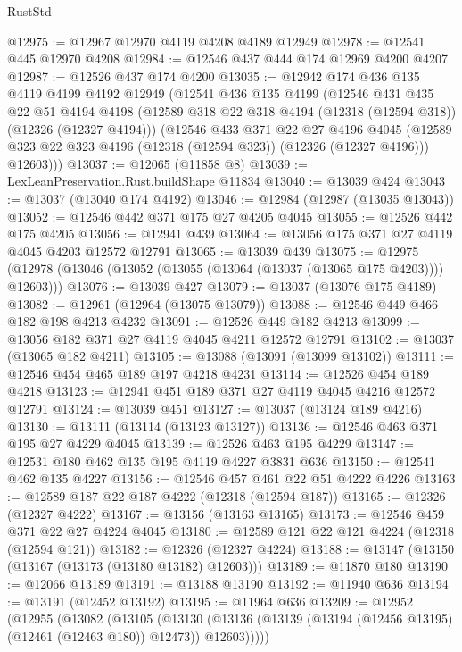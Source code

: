 \begin{lexlean}{RustStd}
\begin{coremodule}
@12975 := @12967 @12970 @4119 @4208 @4189 @12949
@12978 := @12541 @445 @12970 @4208
@12984 := @12546 @437 @444 @174 @12969 @4200 @4207
@12987 := @12526 @437 @174 @4200
@13035 := @12942
    @174
    @436
    @135
    @4119
    @4199
    @4192
    @12949
    (@12541
      @436
      @135
      @4199
      (@12546
        @431
        @435
        @22
        @51
        @4194
        @4198
        (@12589 @318 @22 @318 @4194 (@12318 (@12594 @318)) (@12326 (@12327 @4194)))
        (@12546
          @433
          @371
          @22
          @27
          @4196
          @4045
          (@12589 @323 @22 @323 @4196 (@12318 (@12594 @323)) (@12326 (@12327 @4196)))
          @12603)))
@13037 := @12065 (@11858 @8)
@13039 := LexLeanPreservation.Rust.buildShape @11834
@13040 := @13039 @424
@13043 := @13037 (@13040 @174 @4192)
@13046 := @12984 (@12987 (@13035 @13043))
@13052 := @12546 @442 @371 @175 @27 @4205 @4045
@13055 := @12526 @442 @175 @4205
@13056 := @12941 @439
@13064 := @13056 @175 @371 @27 @4119 @4045 @4203 @12572 @12791
@13065 := @13039 @439
@13075 := @12975 (@12978 (@13046 (@13052 (@13055 (@13064 (@13037 (@13065 @175 @4203)))) @12603)))
@13076 := @13039 @427
@13079 := @13037 (@13076 @175 @4189)
@13082 := @12961 (@12964 (@13075 @13079))
@13088 := @12546 @449 @466 @182 @198 @4213 @4232
@13091 := @12526 @449 @182 @4213
@13099 := @13056 @182 @371 @27 @4119 @4045 @4211 @12572 @12791
@13102 := @13037 (@13065 @182 @4211)
@13105 := @13088 (@13091 (@13099 @13102))
@13111 := @12546 @454 @465 @189 @197 @4218 @4231
@13114 := @12526 @454 @189 @4218
@13123 := @12941 @451 @189 @371 @27 @4119 @4045 @4216 @12572 @12791
@13124 := @13039 @451
@13127 := @13037 (@13124 @189 @4216)
@13130 := @13111 (@13114 (@13123 @13127))
@13136 := @12546 @463 @371 @195 @27 @4229 @4045
@13139 := @12526 @463 @195 @4229
@13147 := @12531 @180 @462 @135 @195 @4119 @4227 @3831 @636
@13150 := @12541 @462 @135 @4227
@13156 := @12546 @457 @461 @22 @51 @4222 @4226
@13163 := @12589 @187 @22 @187 @4222 (@12318 (@12594 @187))
@13165 := @12326 (@12327 @4222)
@13167 := @13156 (@13163 @13165)
@13173 := @12546 @459 @371 @22 @27 @4224 @4045
@13180 := @12589 @121 @22 @121 @4224 (@12318 (@12594 @121))
@13182 := @12326 (@12327 @4224)
@13188 := @13147 (@13150 (@13167 (@13173 (@13180 @13182) @12603)))
@13189 := @11870 @180
@13190 := @12066 @13189
@13191 := @13188 @13190
@13192 := @11940 @636
@13194 := @13191 (@12452 @13192)
@13195 := @11964 @636
@13209 := @12952
    (@12955
      (@13082
        (@13105
          (@13130
            (@13136 (@13139 (@13194 (@12456 @13195) (@12461 (@12463 @180)) @12473)) @12603)))))

\end{coremodule}
\end{lexlean}
